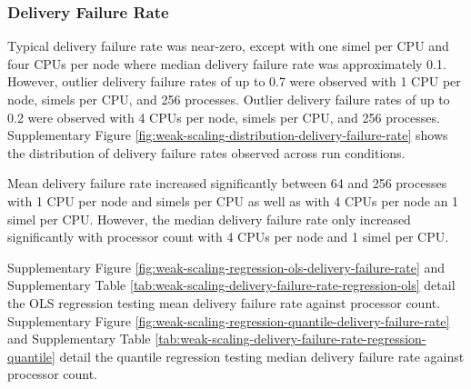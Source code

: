 \subsubsection{Delivery Failure Rate}

Typical delivery failure rate was near-zero, except with one simel per CPU and four CPUs per node where median delivery failure rate was approximately 0.1.
However, outlier delivery failure rates of up to 0.7 were observed with 1 CPU per node,  simels per CPU, and 256 processes.
Outlier delivery failure rates of up to 0.2 were observed with 4 CPUs per node,  simels per CPU, and 256 processes.
Supplementary Figure \ref{fig:weak-scaling-distribution-delivery-failure-rate} shows the distribution of delivery failure rates observed across run conditions.

Mean delivery failure rate increased significantly between 64 and 256 processes with 1 CPU per node and  simels per CPU as well as with 4 CPUs per node an 1 simel per CPU.
However, the median delivery failure rate only increased significantly with processor count with 4 CPUs per node and 1 simel per CPU.

Supplementary Figure \ref{fig:weak-scaling-regression-ols-delivery-failure-rate} and Supplementary Table \ref{tab:weak-scaling-delivery-failure-rate-regression-ols} detail the OLS regression testing mean delivery failure rate against processor count.
Supplementary Figure \ref{fig:weak-scaling-regression-quantile-delivery-failure-rate} and Supplementary Table \ref{tab:weak-scaling-delivery-failure-rate-regression-quantile} detail the quantile regression testing median delivery failure rate against processor count.
